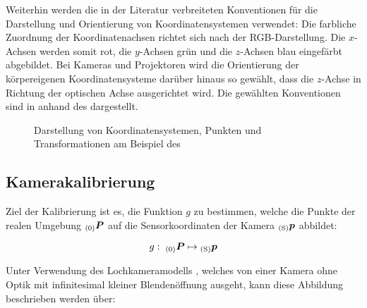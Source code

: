 Weiterhin werden die in der Literatur verbreiteten Konventionen für die Darstellung und Orientierung von Koordinatensystemen verwendet: Die farbliche Zuordnung der Koordinatenachsen richtet sich nach der RGB-Darstellung. Die $x$-Achsen werden somit rot, die $y$-Achsen grün und die $z$-Achsen blau eingefärbt abgebildet. Bei Kameras und Projektoren wird die Orientierung der körpereigenen Koordinatensysteme darüber hinaus so gewählt, dass die $z$-Achse in Richtung der optischen Achse ausgerichtet wird. Die gewählten Konventionen sind in  anhand des  dargestellt.

\begin{figure}[ht]
	\begin{center}%
		\caption{Darstellung von Koordinatensystemen, Punkten und Transformationen am Beispiel des }
		\label{fig.coords}
	\end{center}
\end{figure}

\prever{
}

\subsection{Kamerakalibrierung}
\label{chap.calib}
Ziel der Kalibrierung ist es, die Funktion $g$ zu bestimmen, welche die Punkte der realen Umgebung ${_{{\mathrm{(0)}}}}\mbox{\boldmath{$P$}}$ auf die Sensorkoordinaten der Kamera ${_{{\mathrm{(S)}}}}\mbox{\boldmath{$p$}}$ abbildet:

\begin{equation}
g : \; {_{{\mathrm{(0)}}}}\mbox{\boldmath{$P$}} \mapsto {_{{\mathrm{(S)}}}}\mbox{\boldmath{$p$}}
\end{equation}


\prever{
}
Unter Verwendung des Lochkameramodells \cite{Jaehne2012}, welches von einer Kamera ohne Optik mit infinitesimal kleiner Blendenöffnung ausgeht, kann diese Abbildung beschrieben werden über:

